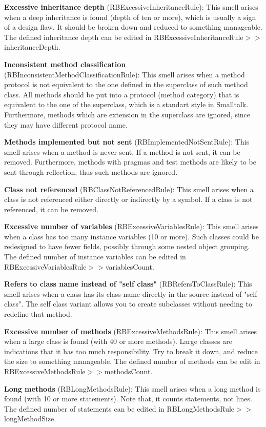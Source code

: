 \documentclass[a4paper,10pt,twoside]{book}
\begin{document}
\textbf{Excessive inheritance depth} (RBExcessiveInheritanceRule): This smell arises when a deep inheritance is found (depth of ten or more), which is usually a sign of a design flaw. It should be broken down and reduced to something manageable. The defined inheritance depth can be edited in RBExcessiveInheritanceRule$>>$inheritanceDepth.

\textbf{Inconsistent method classification} (RBInconsistentMethodClassificationRule): This smell arises when a method protocol is not equivalent to the one defined in the superclass of such method class. All methods should be put into a protocol (method category) that is equivalent to the one of the superclass, which is a standart style in Smalltalk. Furthermore, methods which are extension in the superclass are ignored, since they may have different protocol name.

\textbf{Methods implemented but not sent} (RBImplementedNotSentRule): This smell arises when a method is never sent. If a method is not sent, it can be removed. Furthermore, methods with pragmas and test methods are likely to be sent through reflection, thus such methods are ignored.

\textbf{Class not referenced} (RBClassNotReferencedRule): This smell arises when a class is not referenced either directly or indirectly by a symbol. If a class is not referenced, it can be removed.

\textbf{Excessive number of variables} (RBExcessiveVariablesRule): This smell arises when a class has too many instance variables (10 or more). Such classes could be redesigned to have fewer fields, possibly through some nested object grouping. The defined number of instance variables can be edited in RBExcessiveVariablesRule$>>$variablesCount.

\textbf{Refers to class name instead of "self class"} (RBRefersToClassRule): This smell arises when a class has its class name directly in the source instead of "self class". The self class variant allows you to create subclasses without needing to redefine that method.

\textbf{Excessive number of methods} (RBExcessiveMethodsRule): This smell arises when a large class is found (with 40 or more methods). Large classes are indications that it has too much responsibility. Try to break it down, and reduce the size to something manageable. The defined number of methods can be edit in RBExcessiveMethodsRule$>>$methodsCount.

\textbf{Long methods} (RBLongMethodsRule): This smell arises when a long method is found (with 10 or more statements). Note that, it counts statements, not lines. The defined number of statements can be edited in RBLongMethodsRule$>>$longMethodSize.
\end{document}
